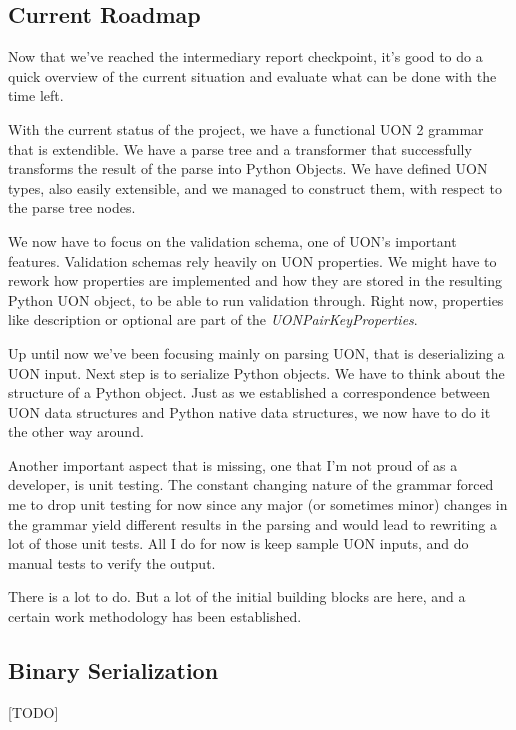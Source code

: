 \documentclass[12pt]{article}
\begin{document}


\subsection{Current Roadmap}
Now that we've reached the intermediary report checkpoint, it's good to do a quick overview of the current situation and evaluate what can be done with the time left.

With the current status of the project, we have a functional UON 2 grammar that is extendible. We have a parse tree and a transformer that successfully transforms the result of the parse into Python Objects. We have defined UON types, also easily extensible, and we managed to construct them, with respect to the parse tree nodes. 

We now have to focus on the validation schema, one of UON's important features. Validation schemas rely heavily on UON properties. We might have to rework how properties are implemented and how they are stored in the resulting Python UON object, to be able to run validation through. Right now, properties like description or optional are part of the \emph{UONPairKeyProperties}. 

Up until now we've been focusing mainly on parsing UON, that is deserializing a UON input. Next step is to serialize Python objects. We have to think about the structure of a Python object. Just as we established a correspondence between UON data structures and Python native data structures, we now have to do it the other way around.

Another important aspect that is missing, one that I'm not proud of as a developer, is unit testing. The constant changing nature of the grammar forced me to drop unit testing for now since any major (or sometimes minor) changes in the grammar yield different results in the parsing and would lead to rewriting a lot of those unit tests. All I do for now is keep sample UON inputs, and do manual tests to verify the output.

There is a lot to do. But a lot of the initial building blocks are here, and a certain work methodology has been established.

\pagebreak

\subsection{Binary Serialization}
[TODO]

\pagebreak
\end{document}
